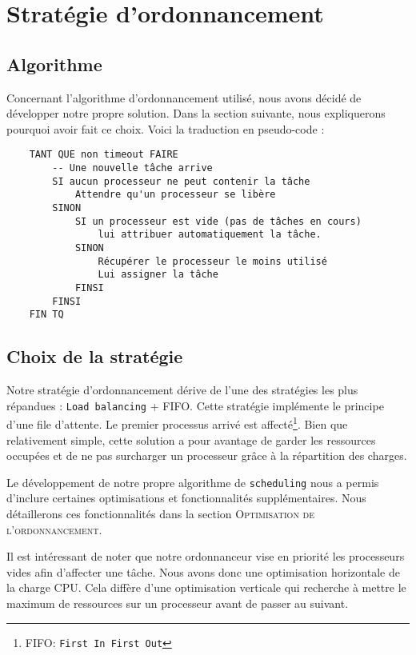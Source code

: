 \chapter{Stratégie d'ordonnancement}

   \section{Algorithme}
    
    Concernant l'algorithme d'ordonnancement utilisé, nous avons décidé de développer notre propre solution. Dans la section suivante, nous expliquerons pourquoi avoir fait ce choix. Voici la traduction en pseudo-code :
    
    \begin{verbatim}
    TANT QUE non timeout FAIRE
        -- Une nouvelle tâche arrive
        SI aucun processeur ne peut contenir la tâche
            Attendre qu'un processeur se libère
        SINON
            SI un processeur est vide (pas de tâches en cours)
                lui attribuer automatiquement la tâche.
            SINON
                Récupérer le processeur le moins utilisé
                Lui assigner la tâche
            FINSI
        FINSI
    FIN TQ
    \end{verbatim}
    
    \section{Choix de la stratégie}

    Notre stratégie d'ordonnancement dérive de l'une des stratégies les plus répandues : \texttt{Load balancing} + FIFO. Cette stratégie implémente le principe d'une file d'attente. Le premier processus arrivé est affecté\footnote{\textsc{FIFO}: \texttt{First In First Out}}. \newline 
    Bien que relativement simple, cette solution a pour avantage de garder les ressources occupées et de ne pas surcharger un processeur grâce à la répartition des charges. \newline
    
    Le développement de notre propre algorithme de \texttt{scheduling} nous a permis d'inclure certaines optimisations et fonctionnalités supplémentaires. Nous détaillerons ces fonctionnalités dans la section \textsc{Optimisation de l'ordonnancement}.
    
    Il est intéressant de noter que notre ordonnanceur vise en priorité les processeurs vides afin d'affecter une tâche. Nous avons donc une optimisation horizontale de la charge CPU. Cela diffère d'une optimisation verticale qui recherche à mettre le maximum de ressources sur un processeur avant de passer au suivant. 
    

